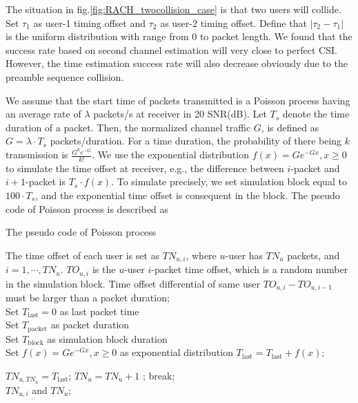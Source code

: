 The situation in fig.\ref{fig:RACH_twocollision_case} is that two users will collide. Set $\tau_1$ as user-1 timing offset and $\tau_2$ as user-2 timing offset. Define that $|\tau_2 - \tau_1|$ is the uniform distribution with range from 0 to packet length. We found that the success rate based on second channel estimation will very close to perfect CSI. However, the time estimation success rate will also decrease obviously due to the preamble sequence collision. 

We assume that the start time of packets transmitted is a Poisson process having an average rate of $\lambda$ packets/s at receiver in 20 SNR(dB). Let $T_s$ denote the time duration of a packet. Then, the normalized channel traffic $G$, is defined as $G=\lambda \cdot T_s$ packets/duration. For a time duration, the probability of there being $k$ transmission is $\frac{G^k e^{-G}}{k!}$. We use the exponential distribution $f(x)=Ge^{-Gx}, x \ge 0 $ to simulate the time offset at receiver, e.g., the difference between $i$-packet and $i+1$-packet is $T_s \cdot f(x)$. To simulate precisely, we set simulation block  equal to $100 \cdot T_s$, and the exponential time offset is consequent in the block. The pseudo code of Poisson process is described as 

\begin{algorithm}[htb]
  \caption{ The pseudo code of Poisson process}
  \label{alg:Framwork}
  \begin{algorithmic}[1]
    \Require
      The time offset of each user is set as ${TN}_{u,i}$, where $u$-user has $TN_u$ packets, and $i = 1, \cdots, TN_u$.  $TO_{u,i}$ is the $u$-user $i$-packet time offset, which is a random number in the simulation block. 
    \Ensure
      Time offset differential of same user ${TO}_{u,i} - {TO}_{u,i-1}$ must be larger than a packet duration; \\
      Set $T_{\text{last}} = 0$ as last packet time \\
      Set $T_{\text{packet}}$ as packet duration \\
      Set $T_{\text{block}}$ as simulation block duration \\
      Set $f(x)=Ge^{-Gx}, x \ge 0$ as exponential distribution 
      \State $T_{\text{last}} = T_{\text{last}} + f(x)$;
     
      	\State ${TN}_{u,{TN_u}} = T_{\text{last}}$;
      	\State $TN_u = TN_u +1$ ;
      	\State break;
      \EndIf
      \EndFor
    \EndWhile \\
    \Return ${TN}_{u,i}$ and $TN_u$;
  \end{algorithmic}
\end{algorithm}



